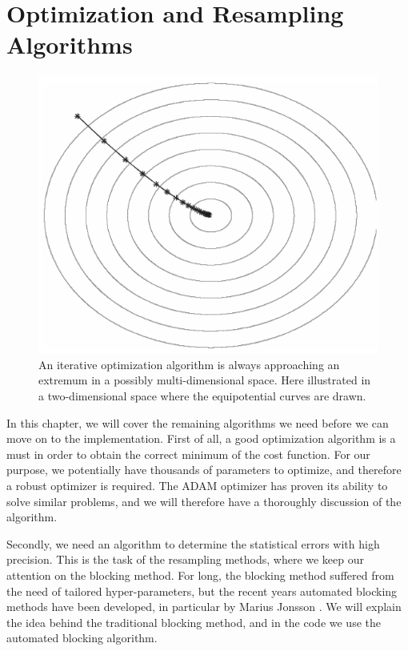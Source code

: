 \chapter{Optimization and Resampling Algorithms} \label{chp:optimization}
\begin{figure}[H]
	\centering
	\includegraphics[scale=0.4]{Images/gd_bw.png}
	\caption{An iterative optimization algorithm is always approaching an extremum in a possibly multi-dimensional space. Here illustrated in a two-dimensional space where the equipotential curves are drawn.}
\end{figure}

In this chapter, we will cover the remaining algorithms we need before we can move on to the implementation. First of all, a good optimization algorithm is a must in order to obtain the correct minimum of the cost function. For our purpose, we potentially have thousands of parameters to optimize, and therefore a robust optimizer is required. The ADAM optimizer has proven its ability to solve similar problems, and we will therefore have a thoroughly discussion of the algorithm.

Secondly, we need an algorithm to determine the statistical errors with high precision. This is the task of the resampling methods, where we keep our attention on the blocking method. For long, the blocking method suffered from the need of tailored hyper-parameters, but the recent years automated blocking methods have been developed, in particular by Marius Jonsson \cite{jonsson_standard_2018}. We will explain the idea behind the traditional blocking method, and in the code we use the automated blocking algorithm. 

